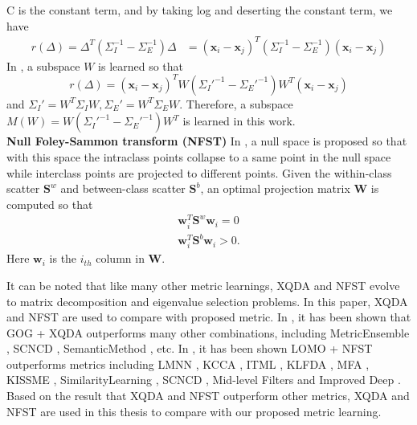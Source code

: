 C is the constant term, and by taking log and deserting the constant term, we have 
\begin{equation}
\begin{aligned}
r(\Delta) = \Delta^T(\Sigma_I^{-1} - \Sigma_E^{-1})\Delta 
	   & = (\bm{x}_i - \bm{x}_j)^T(\Sigma_I^{-1} - \Sigma_E^{-1})(\bm{x}_i - \bm{x}_j)
\end{aligned}
\end{equation}
In \cite{LOMO}, a subspace $W$ is learned so that 
\begin{equation}
r(\Delta) = (\bm{x}_i - \bm{x}_j)^TW({\Sigma_I}'^{-1} - {\Sigma_E}'^{-1})W^T(\bm{x}_i - \bm{x}_j)
\end{equation}
and ${\Sigma_I}' = W^T\Sigma_IW, {\Sigma_E}' = W^T\Sigma_EW$. Therefore, a subspace $M(W) = W({\Sigma_I}'^{-1} - {\Sigma_E}'^{-1})W^T$ is learned in this work.\\
\indent \textbf{Null Foley-Sammon transform (NFST)} In \cite{NFST}, a null space is proposed so that with this space the intraclass points collapse to a same point in the null space while interclass points are projected to different points. Given the within-class scatter $\bm{S}^w$ and between-class scatter $\bm{S}^b$, an optimal projection matrix $\bm{W}$ is computed so that 
\begin{equation}
\begin{aligned}
\bm{w}_i^T\bm{S}^w\bm{w}_i = 0\\
\bm{w}_i^T\bm{S}^b\bm{w}_i > 0.
\end{aligned}
\end{equation}
Here $\bm{w}_i$ is the $i_{th}$ column in $\bm{W}$.

It can be noted that like many other metric learnings, XQDA and NFST evolve to matrix decomposition and eigenvalue selection problems. In this paper, XQDA and NFST are used to compare with proposed metric. In \cite{GOG}, it has been shown that GOG + XQDA outperforms many other combinations, including MetricEnsemble \cite{MetricEnsembles}, SCNCD \cite{SCNCD}, SemanticMethod \cite{SemanticMethod}, etc. In \cite{ NFST}, it has been shown LOMO + NFST outperforms metrics including LMNN \cite{LMNN}, KCCA \cite{KCCA}, ITML \cite{ITML}, KLFDA \cite{KLFDA}, MFA \cite{KernelVersionMetrics}, KISSME \cite{KISSME}, SimilarityLearning \cite{SimilarityLearning}, SCNCD \cite{SCNCD}, Mid-level Filters \cite{MidlevelFilters} and Improved Deep \cite{ImprovedCNN}. Based on the result that XQDA and NFST outperform other metrics, XQDA and NFST are used in this thesis to compare with our proposed metric learning. 

